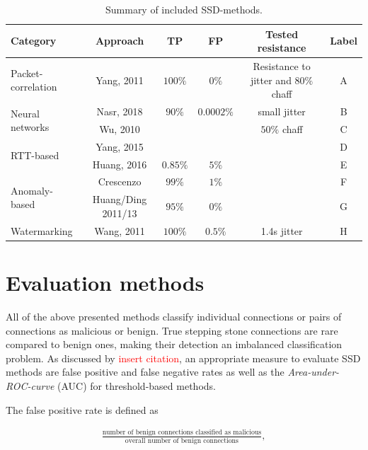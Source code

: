 \documentclass[conference]{IEEEtran}\usepackage[]{graphicx}\usepackage[]{color}
\begin{document}
\begin{table}
\centering
\begin{tabular}{l|c|c|c|c|c}
Category & Approach & TP & FP & Tested resistance & Label\\ \hline
Packet-correlation & Yang, 2011 \cite{yang2011correlating} & $100\%$ & $0\%$& Resistance to jitter and $80\%$ chaff & A\\ \hline
\multirow{2}{*}{Neural networks} & Nasr, 2018 \cite{nasr2018deepcorr} &$90\%$ & $0.0002\%$& small jitter & B\\ \cline{2-5}
 & Wu, 2010 \cite{wu2010neural} &  & & $50\%$ chaff & C\\ \hline
\multirow{2}{*}{RTT-based} & Yang, 2015 \cite{yang2015rtt}&  & & &D\\ \cline{2-5}
 & Huang, 2016 \cite{huang2016detecting} & $0.85\%$ & $5\%$ & & E\\ \hline
\multirow{2}{*}{Anomaly-based} & Crescenzo \cite{di2011detecting} & $99\%$ & $1\%$ & &F\\ \cline{2-5}
 & Huang/Ding 2011/13 \cite{huang2011detecting,ding2013detecting} & $95\%$ & $0\%$ & &G\\ \hline
Watermarking & Wang, 2011 \cite{wang2010robust} & $100\%$ & $0.5\%$ & 1.4s jitter & H\\ \hline
\end{tabular}
\caption{Summary of included SSD-methods.}\label{Tab:Summary}
\end{table}



\section{Evaluation methods}

All of the above presented methods classify individual connections or pairs of connections as malicious or benign. True stepping stone connections are rare compared to benign ones, making their detection an imbalanced classification problem. As discussed by \textcolor{red}{insert citation}, an appropriate measure to evaluate SSD methods are false positive and false negative rates as well as the \textit{Area-under-ROC-curve} (AUC) for threshold-based methods.

The false positive rate is defined as

\begin{align*}
\frac{\text{number of benign connections classified as malicious}}{\text{overall number of benign connections}},
\end{align*}
\end{document}
